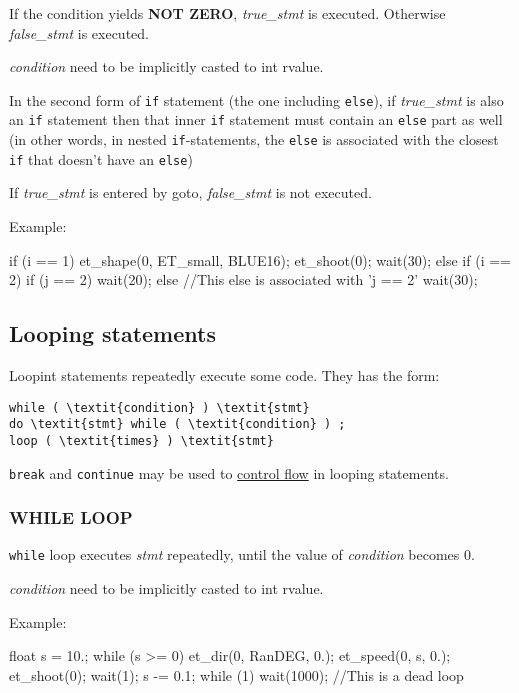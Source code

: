 \documentclass{article}
\begin{document}
If the condition yields \textbf{NOT ZERO}, \textit{true\_stmt} is executed. Otherwise \textit{false\_stmt} is executed.

\textit{condition} need to be implicitly casted to int rvalue.

In the second form of \verb|if| statement (the one including \verb|else|), if \textit{true\_stmt} is also an \verb|if| statement then that inner \verb|if| statement must contain an \verb|else| part as well (in other words, in nested \verb|if|-statements, the \verb|else| is associated with the closest \verb|if| that doesn't have an \verb|else|)

If \textit{true\_stmt} is entered by goto, \textit{false\_stmt} is not executed.

Example:

\begin{MUAvbt}
if (i == 1) {
	et_shape(0, ET_small, BLUE16);
	et_shoot(0);
	wait(30);
}
else if (i == 2)
	if (j == 2)
		wait(20);
	else			//This else is associated with 'j == 2'
		wait(30);
\end{MUAvbt}

\subsection{Looping statements}

Loopint statements repeatedly execute some code. They has the form:

\begin{Verbatim}[frame=single, rulecolor=\color{magenta}, commandchars=\\\{\}]
while ( \textit{condition} ) \textit{stmt}
do \textit{stmt} while ( \textit{condition} ) ;
loop ( \textit{times} ) \textit{stmt}
\end{Verbatim}

\verb|break| and \verb|continue| may be used to \hyperref[break]{control flow} in looping statements.

\subsubsection{WHILE LOOP}

\verb|while| loop executes \textit{stmt} repeatedly, until the value of \textit{condition} becomes 0.

\textit{condition} need to be implicitly casted to int rvalue.

Example:

\begin{MUAvbt}
float s = 10.;
while (s >= 0) {
	et_dir(0, RanDEG, 0.);
	et_speed(0, s, 0.);
	et_shoot(0);
	wait(1);
	s -= 0.1;
}
while (1)
	wait(1000);			//This is a dead loop
\end{MUAvbt}
\end{document}
